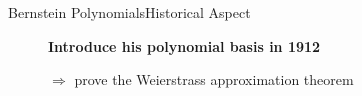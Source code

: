 \documentclass[10pt]{beamer}
\begin{document}
\begin{frame}{Bernstein Polynomials}{Historical Aspect}
\begin{figure}[H]
\begin{minipage}[top]{0.80\linewidth}
\begin{itemize}
      \end{itemize}
      \hspace{2cm}
      \textbf{Introduce his polynomial basis in 1912}
      
      
      \begin{center}
        \hspace{2cm}
        $\Rightarrow$ prove the Weierstrass approximation theorem
      \end{center}
      
    \end{minipage}
  \end{figure}

  
\end{frame}
\end{document}
